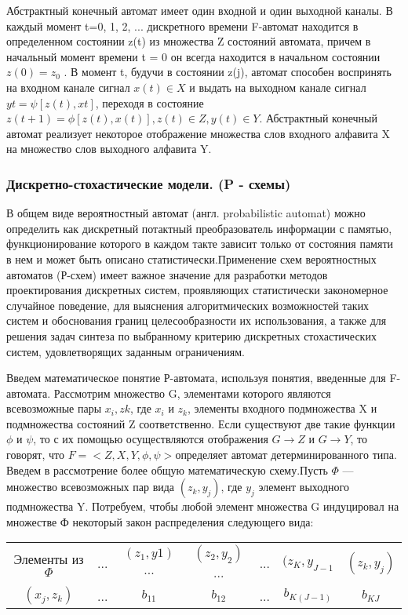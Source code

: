  Абстрактный конечный автомат имеет один входной и один выходной каналы. В каждый момент t=0, 1, 2, ... дискретного времени F-автомат находится в определенном состоянии z(t) из множества Z состояний автомата, причем в начальный момент времени t = 0 он всегда находится в начальном состоянии $z(0) = z_{0}$ . В момент t, будучи в состоянии z(j), автомат способен воспринять на входном канале сигнал $x(t) \in X$ и выдать на выходном канале сигнал $y{t} = \psi[z(t), x{t}]$, переходя в состояние $z(t+1) = \phi[z(t), x(t)], z(t) \in Z, y(t) \in Y$. Абстрактный конечный автомат реализует некоторое отображение множества слов входного алфавита X на множество слов выходного алфавита Y.

 \subsubsection{Дискретно-стохастические модели. (P - схемы)}

  В общем виде вероятностный автомат (англ. probabilistic automat) можно определить как дискретный потактный преобразователь информации с памятью, функционирование которого в каждом такте зависит только от состояния памяти в нем и может быть описано статистически.Применение схем вероятностных автоматов (Р-схем) имеет важное значение для разработки методов проектирования дискретных систем, проявляющих статистически закономерное случайное поведение, для выяснения алгоритмических возможностей таких систем и обоснования границ целесообразности их использования, а также для решения задач синтеза по выбранному критерию дискретных стохастических систем, удовлетворящих заданным ограничениям.

  Введем математическое понятие Р-автомата, используя понятия, введенные для F-автомата. Рассмотрим множество G, элементами которого являются всевозможные пары $x_{i},  z{k}$, где $x_{i}$ и $z_{k}$, элементы входного подмножества X и подмножества состояний Z соответственно. Если существуют две такие функции $\phi$ и $\psi$, то с их помощью осуществляются отображения $G \to Z$ и $G \to Y$, то говорят, что $F = <Z, X, Y, \phi, \psi>$определяет автомат детерминированного типа. Введем в рассмотрение более общую математическую схему.Пусть $\Phi$ — множество всевозможных пар вида $(z_{k}, y_{j})$, где $y_{j}$ элемент выходного подмножества Y. Потребуем, чтобы любой элемент множества G индуцировал на множестве Ф некоторый закон распределения следующего вида:


  \begin{tabular}{ccccccc}
    Элементы из $\Phi$ &  ... & $(z_{1}, y{1})$... & $(z_{2}, y_{2})$... & ... & $(z_{K}, y_{J-1}$ & $(z_{k}, y_{j})$ \\
    $(x_{j}, z_{k})$ & ... & $b_{1 1}$ & $b_{1 2}$ & ... & $b_{K (J-1)}$ & $b_{K J}$ \\
  \end{tabular}

